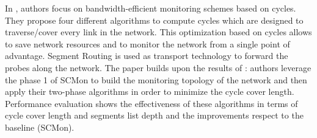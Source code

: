 In \cite{li2018bandwidth}, authors focus on bandwidth-efficient monitoring schemes based on cycles. They propose four different algorithms to compute cycles which are designed to traverse/cover every link in the network. This optimization based on cycles allows to save network resources and to monitor the network from a single point of advantage. Segment Routing is used as transport technology to forward the probes along the network. The paper builds upon the results of \cite{scmon}: authors leverage the phase 1 of SCMon to build the monitoring topology of the network and then apply their two-phase algorithms in order to minimize the cycle cover length. 
Performance evaluation shows the effectiveness of these algorithms in terms of cycle cover length and segments list depth and the improvements respect to the baseline (SCMon). 

